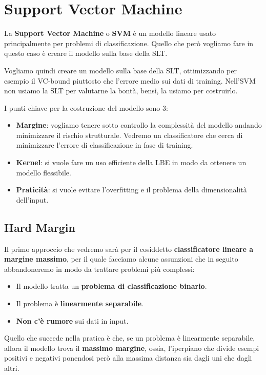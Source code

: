 \chapter{Support Vector Machine}
La \textbf{Support Vector Machine} o \textbf{SVM} \`e un modello lineare usato principalmente per problemi di
classificazione. Quello che per\`o vogliamo fare in questo caso \`e creare il modello sulla base della SLT.

Vogliamo quindi creare un modello sulla base della SLT, ottimizzando per esempio il VC-bound piuttosto che l'errore medio
sui dati di training. Nell'SVM non usiamo la SLT per valutarne la bont\`a, bens\`i, la usiamo per costruirlo.

I punti chiave per la costruzione del modello sono 3:
\begin{itemize}
	\item \textbf{Margine}: vogliamo tenere sotto controllo la complessit\`a del modello andando minimizzare il rischio
	      strutturale. Vedremo un classificatore che cerca di minimizzare l'errore di classificazione in fase di training.
	\item \textbf{Kernel}: si vuole fare un uso efficiente della LBE in modo da ottenere un modello flessibile.
	\item \textbf{Praticit\`a}: si vuole evitare l'overfitting e il problema della dimensionalit\`a dell'input.
\end{itemize}

\section{Hard Margin}
Il primo approccio che vedremo sar\`a per il cosiddetto \textbf{classificatore lineare a margine massimo}, per il quale
facciamo alcune assunzioni che in seguito abbandoneremo in modo da trattare problemi pi\`u complessi:
\begin{itemize}
	\item Il modello tratta un \textbf{problema di classificazione binario}.
	\item Il problema \`e \textbf{linearmente separabile}.
	\item \textbf{Non c'\`e rumore} sui dati in input.
\end{itemize}
Quello che succede nella pratica \`e che, se un problema \`e linearmente separabile, allora il modello trova il
\textbf{massimo margine}, ossia, l'iperpiano che divide esempi positivi e negativi ponendosi per\`o alla massima distanza
sia dagli uni che dagli altri.

